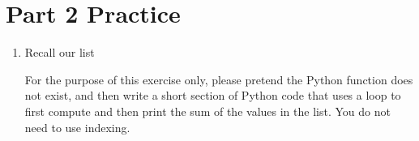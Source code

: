 \documentclass[letterpaper,10pt,english]{sphinxmanual}
\begin{document}
\section{Part 2 Practice}
\label{\detokenize{lecture_notes/lec10_lists2:part-2-practice}}\begin{enumerate}
\def\theenumi{\arabic{enumi}}
\def\labelenumi{\theenumi .}
\makeatletter\def\p@enumii{\p@enumi \theenumi .}\makeatother
\item {} 
Recall our list

\begin{sphinxVerbatim}[commandchars=\\\{\}]
  \PYG{p}{[}     \PYGZbs{}
       \PYG{p}{]}
\end{sphinxVerbatim}

For the purpose of this exercise only, please pretend the Python
 function does not exist, and then write a short section of
Python code that uses a  loop to first compute and then
print the sum of the values in the  list. You do not
need to use indexing.

\end{enumerate}
\end{document}
